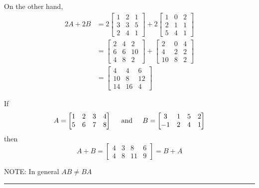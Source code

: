 \begin{enumerate}
\begin{example}
 On the other hand, 
  \begin{align*}
  2A+2B  &=  2 \begin{bmatrix}  1& 2& 1\\ 3 & 3 & 5 \\ 2  &  4  &  1 \end{bmatrix}+ 2 \begin{bmatrix}  1& 0& 2\\ 2 & 1 &  1 \\ 5  &  4  &  1 \end{bmatrix}  \\
  &=   \begin{bmatrix}  2& 4& 2\\ 6 & 6 & 10 \\ 4  &  8  &  2 \end{bmatrix}+  \begin{bmatrix}  2& 0& 4\\ 4 & 2 &  2 \\ 10  &  8  &  2 \end{bmatrix} \\
  &= \begin{bmatrix} 4 & 4  &6 \\ 10 & 8 & 12 \\ 14  &  16  &  4  \end{bmatrix}
 \end{align*}
\end{example}




\begin{example} If
$$ A = \begin{bmatrix}  1& 2& 3 & 4\\ 5 & 6 & 7  & 8 \end{bmatrix} \text{\;\;\;\; and \;\;\;\;} B = \begin{bmatrix}  3& 1& 5 & 2\\ -1 & 2 & 4  & 1 \end{bmatrix}$$ 
then
 $$ A+B = \begin{bmatrix}  4& 3& 8 & 6\\ 4 & 8 & 11  & 9 \end{bmatrix} = B+A$$ 


\end{example}

NOTE:  In general $AB \ne BA$

\rule[0.01in]{\textwidth}{0.0025in}







\end{enumerate}
